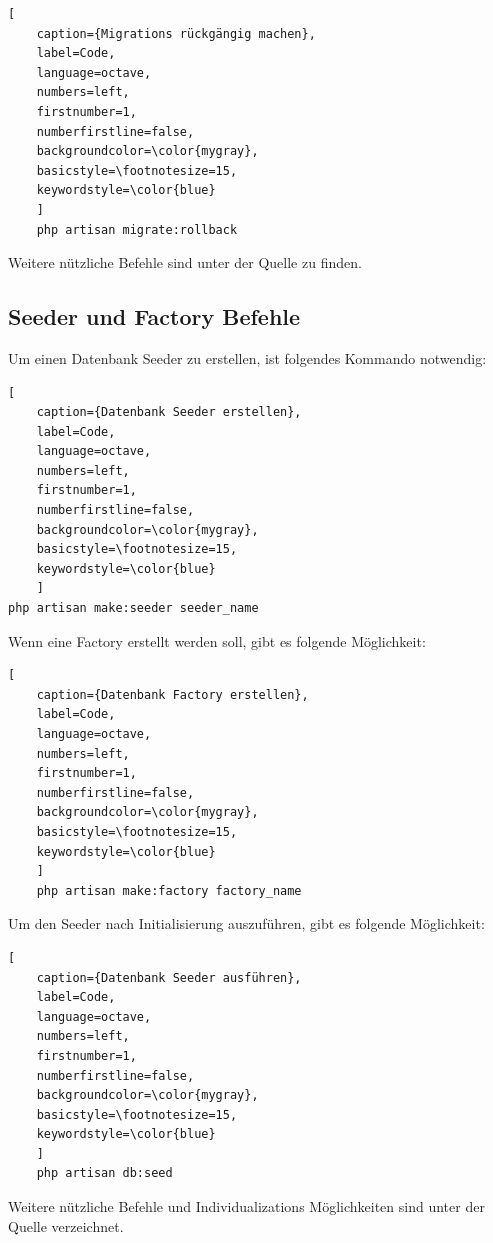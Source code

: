 \begin{lstlisting}[
	caption={Migrations rückgängig machen},
	label=Code,
	language=octave,
	numbers=left,
	firstnumber=1,
	numberfirstline=false,
	backgroundcolor=\color{mygray},
	basicstyle=\footnotesize=15,
	keywordstyle=\color{blue}
	]
	php artisan migrate:rollback 
\end{lstlisting}
Weitere nützliche Befehle sind unter  der Quelle \cite{Migrations} zu finden.

\subsection{Seeder und Factory Befehle}
Um einen Datenbank Seeder zu erstellen, ist folgendes Kommando notwendig: 
\begin{lstlisting}[
	caption={Datenbank Seeder erstellen},
	label=Code,
	language=octave,
	numbers=left,
	firstnumber=1,
	numberfirstline=false,
	backgroundcolor=\color{mygray},
	basicstyle=\footnotesize=15,
	keywordstyle=\color{blue}
	]
php artisan make:seeder seeder_name
\end{lstlisting}
Wenn eine Factory erstellt werden soll, gibt es folgende Möglichkeit:
\begin{lstlisting}[
	caption={Datenbank Factory erstellen},
	label=Code,
	language=octave,
	numbers=left,
	firstnumber=1,
	numberfirstline=false,
	backgroundcolor=\color{mygray},
	basicstyle=\footnotesize=15,
	keywordstyle=\color{blue}
	]
	php artisan make:factory factory_name
\end{lstlisting}
\newpage
Um den Seeder nach Initialisierung auszuführen, gibt es folgende Möglichkeit:
\begin{lstlisting}[
	caption={Datenbank Seeder ausführen},
	label=Code,
	language=octave,
	numbers=left,
	firstnumber=1,
	numberfirstline=false,
	backgroundcolor=\color{mygray},
	basicstyle=\footnotesize=15,
	keywordstyle=\color{blue}
	]
	php artisan db:seed
\end{lstlisting}
Weitere nützliche Befehle und Individualizations Möglichkeiten sind unter der Quelle \cite{Database} verzeichnet.
